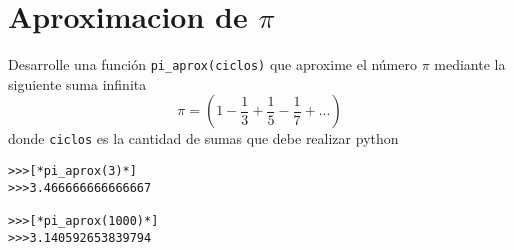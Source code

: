 \section{Aproximacion de $ \pi $}
Desarrolle una función \texttt{pi\_aprox(ciclos)} que aproxime el número $\pi$ mediante la siguiente suma infinita 
\begin{displaymath}
\pi=\left( 1- \frac{1}{3} + \frac{1}{5} - \frac{1}{7}+ ... \right)
\end{displaymath}
donde \texttt{ciclos} es la cantidad de sumas que debe realizar python\\
\begin{lstlisting}[style=consola]
>>>[*pi_aprox(3)*]
>>>3.466666666666667

>>>[*pi_aprox(1000)*]
>>>3.140592653839794
\end{lstlisting}